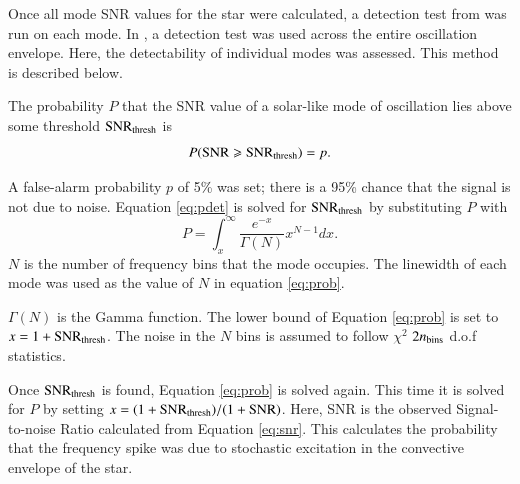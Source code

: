 \documentclass[a4paper,fleqn,usenatbib,useAMS]{mnras}
\begin{document}
Once all mode SNR values for the star were calculated, a detection test from \citet{chaplin_predicting_2011} was run on each mode. In \citet{chaplin_predicting_2011}, a detection test was used across the entire oscillation envelope. Here, the detectability of individual modes was assessed. This method is described below.

The probability $P$ that the SNR value of a solar-like mode of oscillation lies above some threshold ${\rm SNR_{thresh}}$ is
\begin{equation}
\label{eq:pdet}
{P \rm ({ SNR \geq SNR_{thresh}})} =  p .
\end{equation}

A false-alarm probability $p$ of 5\% was set; there is a 95\% chance that the signal is not due to noise. Equation \ref{eq:pdet} is solved for $\rm SNR_{thresh}$ by substituting $P$ with
\begin{equation}
\label{eq:prob}
P = \int_{x}^{\infty} \frac{e^{-x}}{\Gamma(N)} x^{N-1} dx .
\end{equation}
$N$ is the number of frequency bins that the mode occupies. The linewidth of each mode was used as the value of $N$ in equation \ref{eq:prob}.

$\Gamma(N)$ is the Gamma function. The lower bound of Equation \ref{eq:prob} is set to $x=1+{\rm SNR_{thresh}}$. The noise in the $N$ bins is assumed to follow $\chi^{2}$ $2n_{\rm bins}$ d.o.f statistics. 

Once $\rm SNR_{thresh}$ is found, Equation \ref{eq:prob} is solved again. This time it is solved for $P$ by setting $x=(1+{\rm SNR_{thresh}})/(1+{\rm SNR})$. Here, SNR is the observed Signal-to-noise Ratio calculated from Equation \ref{eq:snr}. This calculates the probability that the frequency spike was due to stochastic excitation in the convective envelope of the star.
\end{document}
